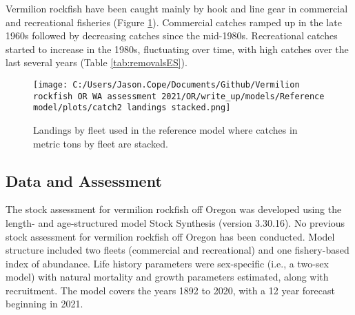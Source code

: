 \documentclass[11pt,
  english,
  a4paper,
]{article}
\begin{document}
\leavevmode\tagmcend\tagstructend


Vermilion rockfish have been caught mainly by hook and line gear in commercial and recreational fisheries (Figure \ref{fig:es-catch}). Commercial catches ramped up in the late 1960s followed by decreasing catches since the mid-1980s. Recreational catches started to increase in the 1980s, fluctuating over time, with high catches over the last several years (Table \ref{tab:removalsES}).

\leavevmode\tagmcend\tagstructend\par

\clearpage




\begin{figure}
\centering
\texttt{[image: C:/Users/Jason.Cope/Documents/Github/Vermilion rockfish OR WA assessment 2021/OR/write\_up/models/Reference model/plots/catch2 landings stacked.png]}
\caption{Landings by fleet used in the reference model where catches in metric tons by fleet are stacked.\label{fig:es-catch}}
\end{figure}

\tagmcend\tagstructend

\clearpage


\hypertarget{data-and-assessment}{%
\subsection*{Data and Assessment}\label{data-and-assessment}}

\leavevmode\tagmcend\tagstructend


The stock assessment for vermilion rockfish off Oregon was developed using the length- and age-structured model Stock Synthesis (version 3.30.16). No previous stock assessment for vermilion rockfish off Oregon has been conducted. Model structure included two fleets (commercial and recreational) and one fishery-based index of abundance. Life history parameters were sex-specific (i.e., a two-sex model) with natural mortality and growth parameters estimated, along with recruitment. The model covers the years 1892 to 2020, with a 12 year forecast beginning in 2021.
\end{document}
